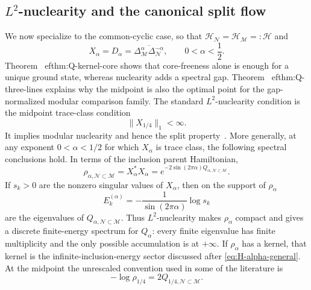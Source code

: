 \documentclass[a4paper,11pt]{article}
\theoremstyle{definition}
\newcommand{\mN}{\mathcal{N}}
\newcommand{\mH}{\mathcal{H}}
\newcommand{\mM}{\mathcal{M}}
\begin{document}
\subsection{$L^2$-nuclearity and the canonical split flow}
\label{sec:nuclearity}

We now specialize to the common-cyclic case, so that
$\mH_{\mN}=\mH_{\mM}=: \mathcal H$ and
\begin{equation}
    X_\alpha=D_\alpha
    =\overline{\Delta_{\mM}^\alpha\Delta_{\mN}^{-\alpha}},
    \qquad 0<\alpha<\frac12 .
\end{equation}
Theorem~
ef{thm:Q-kernel-core} shows that core-freeness alone
is enough for a unique ground state, whereas nuclearity adds a spectral
gap. Theorem~
ef{thm:Q-three-lines} explains why the midpoint is
also the optimal point for the gap-normalized modular comparison family.
The standard $L^2$-nuclearity condition is the midpoint trace-class condition
\begin{equation}
    \boxed{\|X_{1/4}\|_1<\infty .}
    \label{eq:L2-nuclearity-alpha}
\end{equation}
It implies modular nuclearity and hence the split property~\cite{BDL2007}. More generally, at any exponent $0<\alpha<1/2$ for which $X_\alpha$ is trace class, the following spectral conclusions hold. In terms of the inclusion parent Hamiltonian,
\begin{equation}
    \rho_{\alpha,\mN\subset\mM}
    =X_\alpha^*X_\alpha
    =e^{-2\sin(2\pi\alpha)Q_{\alpha,\mN\subset\mM}}.
    \label{eq:rho-inclusion-vs-split}
\end{equation}
If $s_k>0$ are the nonzero singular values of $X_\alpha$, then on the support
of $\rho_\alpha$
\begin{equation}
    E_k^{(\alpha)}
    =-\frac{1}{\sin(2\pi\alpha)}\log s_k
\end{equation}
are the eigenvalues of $Q_{\alpha,\mN\subset\mM}$. Thus $L^2$-nuclearity makes
$\rho_\alpha$ compact and gives a discrete finite-energy spectrum for
$Q_\alpha$: every finite eigenvalue has finite multiplicity and the only
possible accumulation is at $+\infty$. If $\rho_\alpha$ has a kernel, that
kernel is the infinite-inclusion-energy sector discussed after
\eqref{eq:H-alpha-general}. At the midpoint the unrescaled convention used in
some of the literature is
\begin{equation}
    -\log\rho_{1/4}=2Q_{1/4,\mN\subset\mM}.
\end{equation}
\end{document}
